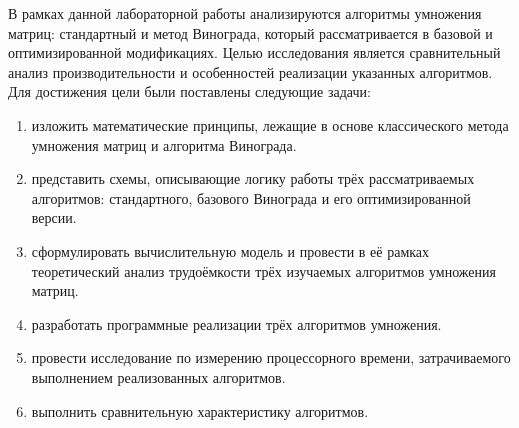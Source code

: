 
В рамках данной лабораторной работы анализируются алгоритмы умножения матриц: стандартный и метод Винограда, который рассматривается в базовой и оптимизированной модификациях.
Целью исследования является сравнительный анализ производительности и особенностей реализации указанных алгоритмов.
Для достижения цели были поставлены следующие задачи:

\begin{enumerate}
	\item изложить математические принципы, лежащие в основе классического метода умножения матриц и алгоритма Винограда.
	\item представить схемы, описывающие логику работы трёх рассматриваемых алгоритмов: стандартного, базового Винограда и его оптимизированной версии.
	\item сформулировать вычислительную модель и провести в её рамках теоретический анализ трудоёмкости трёх изучаемых алгоритмов умножения матриц.
	\item разработать программные реализации трёх алгоритмов умножения.
	\item провести исследование по измерению процессорного времени, затрачиваемого выполнением реализованных алгоритмов.
	\item выполнить сравнительную характеристику алгоритмов.
\end{enumerate}
\newpage

\clearpage
